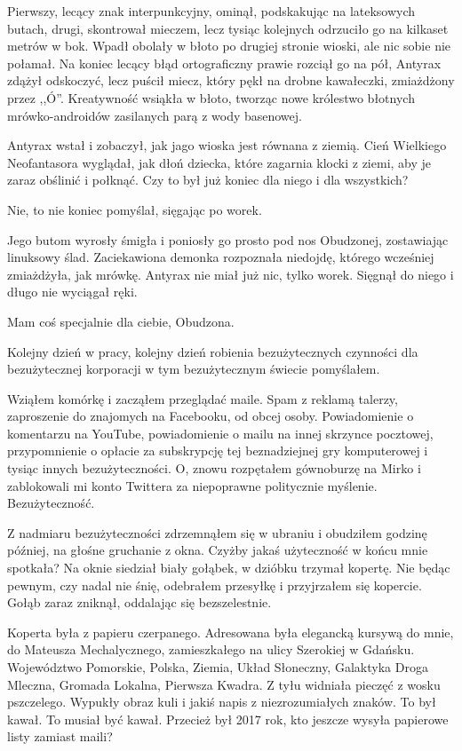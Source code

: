 Pierwszy, lecący znak interpunkcyjny, ominął, podskakując na lateksowych butach, drugi, skontrował mieczem, lecz tysiąc kolejnych odrzuciło go na kilkaset metrów w bok.
Wpadł obolały w błoto po drugiej stronie wioski, ale nic sobie nie połamał.
Na koniec lecący błąd ortograficzny prawie rozciął go na pół, Antyrax zdążył odskoczyć, lecz puścił miecz, który pękł na drobne kawałeczki, zmiażdżony przez ,,Ó''.
Kreatywność wsiąkła w błoto, tworząc nowe królestwo błotnych mrówko-androidów zasilanych parą z wody basenowej.

Antyrax wstał i zobaczył, jak jago wioska jest równana z ziemią.
Cień Wielkiego Neofantasora wyglądał, jak dłoń dziecka, które zagarnia klocki z ziemi, aby je zaraz obślinić i połknąć.
Czy to był już koniec dla niego i dla wszystkich?

\ds{} Nie, to nie koniec \dm{} pomyślał, sięgając po worek. \de{}

Jego butom wyrosły śmigła i poniosły go prosto pod nos Obudzonej, zostawiając linuksowy ślad.
Zaciekawiona demonka rozpoznała niedojdę, którego wcześniej zmiażdżyła, jak mrówkę.
Antyrax nie miał już nic, tylko worek. Sięgnął do niego i długo nie wyciągał ręki.

\ds{} Mam coś specjalnie dla ciebie, Obudzona. \de{}

\divider{}

\ds{} Kolejny dzień w pracy, kolejny dzień robienia bezużytecznych czynności dla bezużytecznej korporacji w tym bezużytecznym świecie \dm{} pomyślałem. \de{}

Wziąłem komórkę i zacząłem przeglądać maile.
Spam z reklamą talerzy, zaproszenie do znajomych na Facebooku, od obcej osoby. Powiadomienie o komentarzu na YouTube, 
powiadomienie o mailu na innej skrzynce pocztowej, przypomnienie o opłacie za subskrypcję tej beznadziejnej gry komputerowej i tysiąc innych bezużyteczności.
O, znowu rozpętałem gównoburzę na Mirko i zablokowali mi konto Twittera za niepoprawne politycznie myślenie.
Bezużyteczność.

Z nadmiaru bezużyteczności zdrzemnąłem się w ubraniu i obudziłem godzinę później, na głośne gruchanie z okna.
Czyżby jakaś użyteczność w końcu mnie spotkała?
Na oknie siedział biały gołąbek, w dzióbku trzymał kopertę.
Nie będąc pewnym, czy nadal nie śnię, odebrałem przesyłkę i przyjrzałem się kopercie.
Gołąb zaraz zniknął, oddalając się bezszelestnie.

Koperta była z papieru czerpanego.
Adresowana była elegancką kursywą do mnie, do Mateusza Mechalycznego, zamieszkałego na ulicy Szerokiej w Gdańsku. 
Województwo Pomorskie, Polska, Ziemia, Układ Słoneczny, Galaktyka Droga Mleczna, Gromada Lokalna, Pierwsza Kwadra.
Z tyłu widniała pieczęć z wosku pszczelego.
Wypukły obraz kuli i jakiś napis z niezrozumiałych znaków.
To był kawał. To musiał być kawał.
Przecież był 2017 rok, kto jeszcze wysyła papierowe listy zamiast maili?

